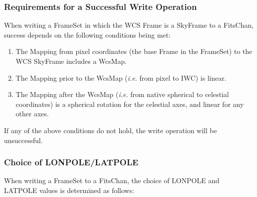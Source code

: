 \documentclass[twoside,11pt]{article}
\begin{document}
\subsubsection{Requirements for a Successful Write Operation}
When writing a FrameSet in which the WCS
Frame is a SkyFrame to a
FitsChan, success depends on the following conditions 
being met:

\begin{enumerate}
\item The Mapping from pixel coordinates (the base Frame 
in the FrameSet) to the WCS SkyFrame includes a WcsMap.
\item The Mapping prior to the WcsMap (\emph{i.e.} from pixel to IWC) is linear. 
\item The Mapping after the WcsMap (\emph{i.e.} from native spherical to
celestial coordinates) is a spherical rotation for the
celestial axes, and linear for any other axes.
\end{enumerate}

If any of the above conditions do not hold, the write operation will be
unsuccessful.

\subsubsection{Choice of LONPOLE/LATPOLE}
When writing a FrameSet to a FitsChan, 
the choice of LONPOLE and LATPOLE values is determined as follows:
\end{document}
